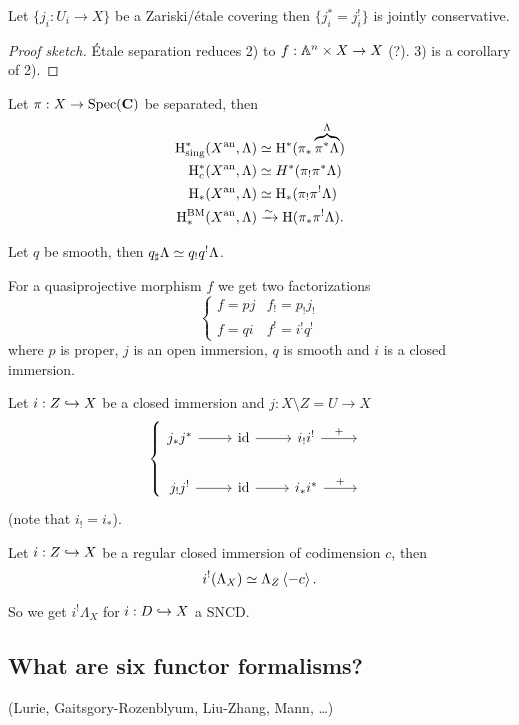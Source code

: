 \begin{exercise}
Let $\{j_i:U_i\to X\} $ be a Zariski/\'etale covering then $\{j_i^{*}=j_i^{!}\} $ is
jointly conservative.
\end{exercise}
\begin{proof}[Proof sketch]
\'Etale separation reduces 2) to $f:\Aff^{n}\times X\to X$ (?). 3) is a corollary of 2).
\end{proof}
\begin{proposition}
Let $\pi:X\to \Spec(\bb{C})$ be separated, then
\begin{align*}
\mathrm{H}_{\text{sing}}^{*}(X^\text{an},\Lambda) &\simeq \mathrm{H}^{*}(\pi_*\overbrace{\pi^{*}\Lambda}^{\Lambda}) \\
\mathrm{H}_c^{*}(X^\text{an}, \Lambda) &\simeq H^{*}(\pi_!\pi^{*}\Lambda) \\
\mathrm{H}_*(X^\text{an}, \Lambda) &\simeq \mathrm{H}_*(\pi_!\pi^{!}\Lambda) \\
\mathrm{H}_*^{\text{BM}}(X^\text{an},\Lambda) &\xrightarrow{\sim} \mathrm{H}(\pi_*\pi^{!}\Lambda).
\end{align*}
\end{proposition}
\begin{remark}
Let $q$ be smooth, then $q_\sharp\Lambda\simeq q_!q^{!}\Lambda$.
\end{remark}
For a quasiprojective morphism $f$ we get two factorizations
\[
\begin{cases}
f = pj & f_! = p_!j_! \\
f = qi & f^! = i^!q^!
\end{cases}
\]
where $p$ is proper, $j$ is an open immersion, $q$ is smooth and $i$ is a closed immersion.

\begin{proposition}
Let $i:Z\hookrightarrow X$ be a closed immersion and $j:X\setminus Z=U\to X$
\[
\left\{
\begin{tikzcd}
j_{*}j^{*} \ar[r] & \id \ar[r] & i_!i^{!} \ar[r,"+"] & {} \\
j_!j^{!} \ar[r] & \id \ar[r] & i_* i^{*} \ar[r,"+"] & {}
\end{tikzcd}
\right.
\]
(note that $i_! = i_*$).
\end{proposition}
\begin{proposition}
Let $i:Z\hookrightarrow X$ be a regular closed immersion of codimension $c$, then
\[
i^{!}(\Lambda_X) \simeq \Lambda_Z \left<-c \right>.
\]
\end{proposition}
So we get $i^{!}\Lambda_X$ for $i:D\hookrightarrow X$ a SNCD.

\subsection{What are six functor formalisms?}
(Lurie, Gaitsgory-Rozenblyum, Liu-Zhang, Mann, \dots)

